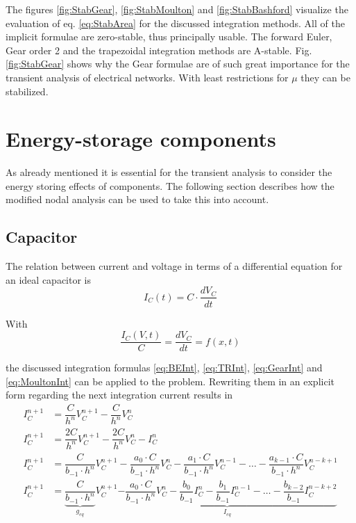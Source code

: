 \documentclass[10pt]{report}
\begin{document}
The figures \ref{fig:StabGear}, \ref{fig:StabMoulton} and
\ref{fig:StabBashford} visualize the evaluation of
eq. \eqref{eq:StabArea} for the discussed integration methods.  All of
the implicit formulae are zero-stable, thus principally usable.  The
forward Euler, Gear order 2 and the trapezoidal integration methods
are A-stable.  Fig. \ref{fig:StabGear} shows why the Gear formulae are
of such great importance for the transient analysis of electrical
networks.  With least restrictions for $\mu$ they can be stabilized.

\section{Energy-storage components}

As already mentioned it is essential for the transient analysis to
consider the energy storing effects of components.  The following
section describes how the modified nodal analysis can be used to take
this into account.

\subsection{Capacitor}

The relation between current and voltage in terms of a differential
equation for an ideal capacitor is
\begin{equation}
\label{eq:ConstCap}
I_C(t) = C\cdot \dfrac{d V_C}{d t}
\end{equation}

With
\begin{equation}
\dfrac{I_C(V, t)}{C} = \dfrac{d V_C}{d t} = f(x,t)
\end{equation}

the discussed integration formulas \eqref{eq:BEInt}, \eqref{eq:TRInt},
\eqref{eq:GearInt} and \eqref{eq:MoultonInt} can be applied to the
problem.  Rewriting them in an explicit form regarding the next
integration current results in
\begin{align}
\label{eq:EulerIC}
I_C^{n+1} &= \dfrac{C}{h^{n}} V_C^{n+1} - \dfrac{C}{h^{n}} V_C^{n}\\
I_C^{n+1} &= \dfrac{2C}{h^{n}} V_C^{n+1} - \dfrac{2C}{h^{n}} V_C^{n} - I_C^n\\
I_C^{n+1} &= \dfrac{C}{b_{-1}\cdot h^{n}} V_C^{n+1} - \dfrac{a_0\cdot C}{b_{-1}\cdot h^{n}} V_C^{n} - \dfrac{a_1\cdot C}{b_{-1}\cdot h^{n}} V_C^{n-1} - \ldots - \dfrac{a_{k-1}\cdot C}{b_{-1}\cdot h^{n}} V_C^{n-k+1}\\
I_C^{n+1} &= \underbrace{\dfrac{C}{b_{-1}\cdot h^{n}}}_{g_{eq}} V_C^{n+1} \underbrace{- \dfrac{a_0\cdot C}{b_{-1}\cdot h^{n}} V_C^{n} - \dfrac{b_0}{b_{-1}} I_C^n - \dfrac{b_1}{b_{-1}} I_C^{n-1} - \ldots - \dfrac{b_{k-2}}{b_{-1}} I_C^{n-k+2}}_{I_{eq}}
\end{align}
\end{document}
